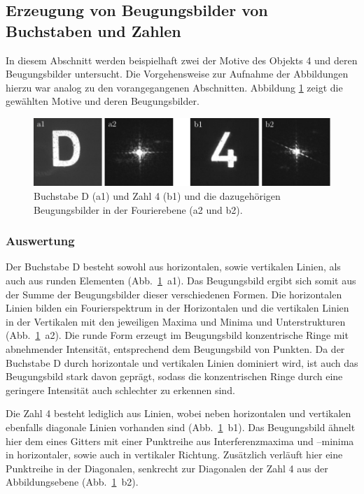 \subsection{Erzeugung von Beugungsbilder von Buchstaben und Zahlen}

In diesem Abschnitt werden beispielhaft zwei der Motive des Objekts 4 und deren Beugungsbilder untersucht. Die Vorgehensweise zur Aufnahme der Abbildungen hierzu war analog zu den vorangegangenen Abschnitten. Abbildung \ref{fig:ziffern_mit_spektren} zeigt die gewählten Motive und deren Beugungsbilder. 

\begin{figure}[h]
	\centering
	\includegraphics{images/Regina/abb19.pdf}
	\caption[Ziffern mit Fourierspektren]{
		Buchstabe D (a1) und Zahl 4 (b1) und die dazugehörigen Beugungsbilder in der Fourierebene (a2 und b2).
	}
	\label{fig:ziffern_mit_spektren}
\end{figure}

\subsubsection*{Auswertung}

Der Buchstabe D besteht sowohl aus horizontalen, sowie vertikalen Linien, als auch aus runden Elementen (Abb.~\ref{fig:ziffern_mit_spektren}~a1). Das Beugungsbild ergibt sich somit aus der Summe der Beugungsbilder dieser verschiedenen Formen. Die horizontalen Linien bilden ein Fourierspektrum in der Horizontalen und die vertikalen Linien in der Vertikalen mit den jeweiligen Maxima und Minima und Unterstrukturen (Abb.~\ref{fig:ziffern_mit_spektren}~a2). Die runde Form erzeugt im Beugungsbild konzentrische Ringe mit abnehmender Intensität, entsprechend dem Beugungsbild von Punkten. Da der Buchstabe D durch horizontale und vertikalen Linien dominiert wird, ist auch das Beugungsbild stark davon geprägt, sodass die konzentrischen Ringe durch eine geringere Intensität auch schlechter zu erkennen sind.

Die Zahl 4 besteht lediglich aus Linien, wobei neben horizontalen und vertikalen ebenfalls diagonale Linien vorhanden sind (Abb.~\ref{fig:ziffern_mit_spektren}~b1). Das Beugungsbild ähnelt hier dem eines Gitters mit einer Punktreihe aus Interferenzmaxima und –minima in horizontaler, sowie auch in vertikaler Richtung. Zusätzlich verläuft hier eine Punktreihe in der Diagonalen, senkrecht zur Diagonalen der Zahl 4 aus der Abbildungsebene (Abb.~\ref{fig:ziffern_mit_spektren}~b2).

